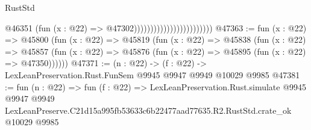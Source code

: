 \begin{lexlean}{RustStd}
\begin{coremodule}
                                                @46351
                                                  (fun (x : @22) => @47302))))))))))))))))))))))))
@47363 := fun (x : @22) =>
  @45800
    (fun (x : @22) =>
    @45819
      (fun (x : @22) =>
      @45838
        (fun (x : @22) =>
        @45857 (fun (x : @22) => @45876 (fun (x : @22) => @45895 (fun (x : @22) => @47350))))))
@47371 := (n : @22) -> (f : @22) -> LexLeanPreservation.Rust.FunSem @9945 @9947 @9949 @10029 @9985
@47381 := fun (n : @22) =>
  fun (f : @22) =>
  LexLeanPreservation.Rust.simulate
    @9945
    @9947
    @9949
    LexLeanPreserve.C21d15a995fb53633c6b22477aad77635.R2.RustStd.crate_ok
    @10029
    @9985
\end{coremodule}
\end{lexlean}
